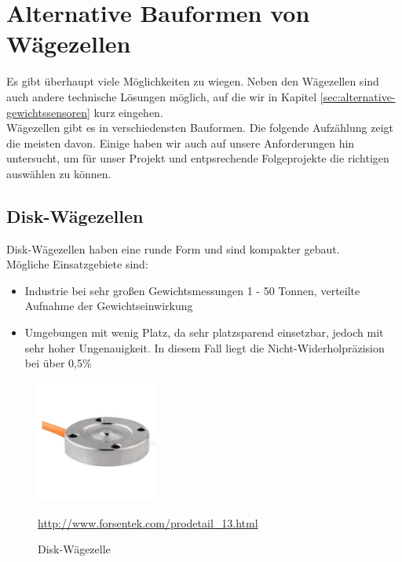 \section{Alternative Bauformen von Wägezellen}
Es gibt überhaupt viele Möglichkeiten zu wiegen. Neben den Wägezellen sind auch andere technische Lösungen möglich, auf die wir in Kapitel \ref{sec:alternative-gewichtssensoren} kurz eingehen.\\
Wägezellen gibt es in verschiedensten Bauformen. Die folgende Aufzählung zeigt die meisten davon. Einige haben wir auch auf unsere Anforderungen hin untersucht, um für unser Projekt und entpsrechende Folgeprojekte die richtigen auswählen zu können.
\subsection{Disk-Wägezellen}
Disk-Wägezellen haben eine runde Form und sind kompakter gebaut.\\
Mögliche Einsatzgebiete sind:
\begin{itemize}
    \item Industrie bei sehr großen Gewichtsmessungen 1 - 50 Tonnen, verteilte Aufnahme der Gewichtseinwirkung
    \item Umgebungen mit wenig Platz, da sehr platzsparend einsetzbar, jedoch mit sehr hoher Ungenauigkeit. In diesem Fall liegt die Nicht-Widerholpräzision bei über 0,5\%
\end{itemize}

\begin{figure}[H]
    \center
    \includegraphics[width=4cm]{Bilder/waegezelle-disk.jpg}\\
    \caption{Disk-Wägezelle}
    \begin{center} \quelle\url{http://www.forsentek.com/prodetail_13.html} \end{center}
\end{figure}
\newpage
